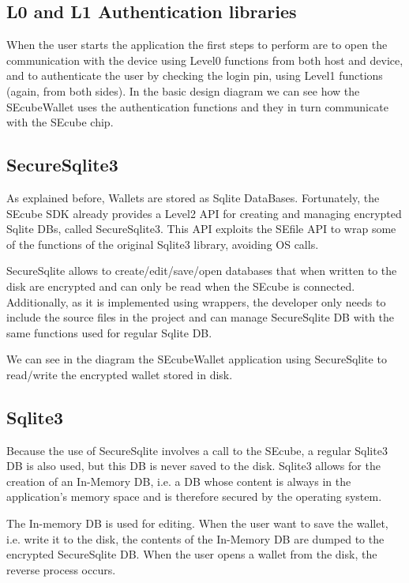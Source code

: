 \subsection{L0 and L1 Authentication libraries}

When the user starts the application the first steps to perform are to open the communication with the device using Level0 functions from both host and device, and to authenticate the user by checking the login pin, using Level1 functions (again, from both sides). In the basic design diagram we can see how the SEcubeWallet uses the authentication functions and they in turn communicate with the SEcube chip.

\subsection{SecureSqlite3}
As explained before, Wallets are stored as Sqlite DataBases. Fortunately, the SEcube SDK already provides a Level2 API for creating and managing encrypted Sqlite DBs, called SecureSqlite3. This API exploits the SEfile API to wrap some of the functions of the original Sqlite3 library, avoiding OS calls.

SecureSqlite allows to create/edit/save/open databases that when written to the disk are encrypted and can only be read when the SEcube is connected. Additionally, as it is implemented using wrappers, the developer only needs to include the source files in the project and can manage SecureSqlite DB with the same functions used for regular Sqlite DB.

We can see in the diagram the SEcubeWallet application using SecureSqlite to read/write the encrypted wallet stored in disk.

\subsection{Sqlite3}
Because the use of SecureSqlite involves a call to the SEcube, a regular Sqlite3 DB is also used, but this DB is never saved to the disk. Sqlite3 allows for the creation of an In-Memory DB, i.e. a DB whose content is always in the application's memory space and is therefore secured by the operating system. 

The In-memory DB is used for editing. When the user want to save the wallet, i.e. write it to the disk, the contents of the In-Memory DB are dumped to the encrypted SecureSqlite DB. When the user opens a wallet from the disk, the reverse process occurs.

